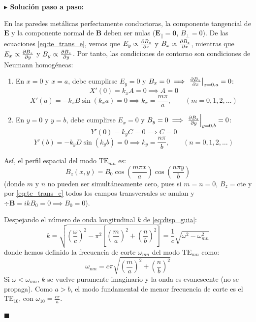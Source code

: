 \documentclass[11pt,a4paper]{book}
\newenvironment{solucion}{%
    \par\medskip\noindent\textbf{\color{blue!65!black}\Large $\blacktriangleright$ Solución paso a paso:}\par\medskip
}{%
    \hfill$\blacksquare$\par\bigskip
}
\newcommand{\Evec}{\bm{E}}
\newcommand{\Bvec}{\bm{B}}
\begin{document}
\begin{solucion}
En las paredes metálicas perfectamente conductoras, la componente tangencial de $\Evec$ y la componente normal de $\Bvec$ deben ser nulas ($\Evec_\parallel = \bm{0}$, $B_\perp = 0$). De las ecuaciones \eqref{eq:te_trans_e}, vemos que $E_y \propto \pdv{B_z}{x}$ y $B_x \propto \pdv{B_z}{x}$, mientras que $E_x \propto \pdv{B_z}{y}$ y $B_y \propto \pdv{B_z}{y}$. Por tanto, las condiciones de contorno son condiciones de Neumann homogéneas:
\begin{enumerate}
    \item En $x = 0$ y $x = a$, debe cumplirse $E_y = 0$ y $B_x = 0 \implies \left.\pdv{B_z}{x}\right|_{x=0,a} = 0$:
    \begin{equation}
        X'(0) = k_x A = 0 \implies A = 0
    \end{equation}
    \begin{equation}
        X'(a) = -k_x B \sin(k_x a) = 0 \implies k_x = \frac{m\pi}{a}, \qquad (m = 0, 1, 2, \dots)
    \end{equation}
    \item En $y = 0$ y $y = b$, debe cumplirse $E_x = 0$ y $B_y = 0 \implies \left.\pdv{B_z}{y}\right|_{y=0,b} = 0$:
    \begin{equation}
        Y'(0) = k_y C = 0 \implies C = 0
    \end{equation}
    \begin{equation}
        Y'(b) = -k_y D \sin(k_y b) = 0 \implies k_y = \frac{n\pi}{b}, \qquad (n = 0, 1, 2, \dots)
    \end{equation}
\end{enumerate}
Así, el perfil espacial del modo $\text{TE}_{mn}$ es:
\begin{equation}
    B_z(x,y) = B_0 \cos\left(\frac{m\pi x}{a}\right)\cos\left(\frac{n\pi y}{b}\right)
\end{equation}
(donde $m$ y $n$ no pueden ser simultáneamente cero, pues si $m=n=0$, $B_z = \text{cte}$ y por \eqref{eq:te_trans_e} todos los campos transversales se anulan y $\div{\Bvec} = ikB_0 = 0 \implies B_0 = 0$).

Despejando el número de onda longitudinal $k$ de \eqref{eq:disp_guia}:
\begin{equation}
    k = \sqrt{\left(\frac{\omega}{c}\right)^2 - \pi^2\left[\left(\frac{m}{a}\right)^2 + \left(\frac{n}{b}\right)^2\right]} = \frac{1}{c}\sqrt{\omega^2 - \omega_{mn}^2}
\end{equation}
donde hemos definido la frecuencia de corte $\omega_{mn}$ del modo $\text{TE}_{mn}$ como:
\begin{equation}
    \omega_{mn} = c\pi\sqrt{\left(\frac{m}{a}\right)^2 + \left(\frac{n}{b}\right)^2}
\end{equation}
Si $\omega < \omega_{mn}$, $k$ se vuelve puramente imaginario y la onda es evanescente (no se propaga). Como $a > b$, el modo fundamental de menor frecuencia de corte es el $\text{TE}_{10}$, con $\omega_{10} = \frac{c\pi}{a}$.


\end{solucion}
\end{document}
